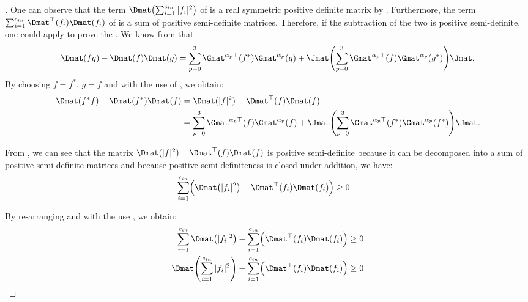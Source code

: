 \begin{proof}[]
\noindent
One can observe that the term $\Dmat \left( \sum_{i=1}^{\cin} |f_i|^2 \right)$ of  is a real symmetric positive definite matrix by . 
Furthermore, the term $\sum_{i=1}^{\cin} \Dmat^{\top} \left(f_i \right) \Dmat (f_i)$ of  is a sum of positive semi-definite matrices.
Therefore, if the subtraction of the two is positive semi-definite, one could apply  to prove the . 
We know from  that 
\begin{equation}
  \Dmat(fg) - \Dmat(f)\Dmat(g) = \sum_{p=0}^3 \Gmat^{\alpha_p \top}(f^*) \Gmat^{\alpha_p}(g) + \Jmat \left( \sum_{p=0}^3 \Gmat^{\alpha_p \top}(f) \Gmat^{\alpha_p}(g^*) \right) \Jmat.
\end{equation}
By choosing $f = f^*$, $g = f$ and with the use of , we obtain:
\begin{align} \label{equation:widom_identity_block_topelitz}
  \Dmat(f^* f) - \Dmat(f^*)\Dmat(f)
  &= \Dmat(|f|^2) - \Dmat^{\top}(f)\Dmat(f) \\
  &= \sum_{p=0}^3 \Gmat^{\alpha_p \top}(f)\Gmat^{\alpha_p}(f) + \Jmat \left( \sum_{p=0}^3 \Gmat^{\alpha_p \top}(f^*)\Gmat^{\alpha_p} (f^*) \right) \Jmat .
\end{align}

\noindent
From , we can see that the matrix $\Dmat(|f|^2) - \Dmat^{\top}(f)\Dmat(f)$
is positive semi-definite because it can be decomposed into a sum of positive semi-definite matrices and because positive semi-definiteness is closed under addition, we have:
\begin{align}
    \sum_{i=1}^{\cin} \leftmat \Dmat \left( |f_i|^2 \right) - \Dmat^{\top} \left(f_i \right) \Dmat (f_i) \rightmat &\geq 0
\end{align}

\noindent
By re-arranging and with the use , we obtain:
\begin{align}
   \sum_{i=1}^{\cin} \Dmat \left( |f_i|^2 \right) - \sum_{i=1}^{\cin} \leftmat \Dmat^{\top} \left(f_i \right) \Dmat (f_i) \rightmat &\geq 0 \\
    \Dmat \left( \sum_{i=1}^{\cin} |f_i|^2 \right) - \sum_{i=1}^{\cin} \leftmat \Dmat^{\top} \left(f_i \right) \Dmat (f_i) \rightmat &\geq 0
\end{align}


\end{proof}
